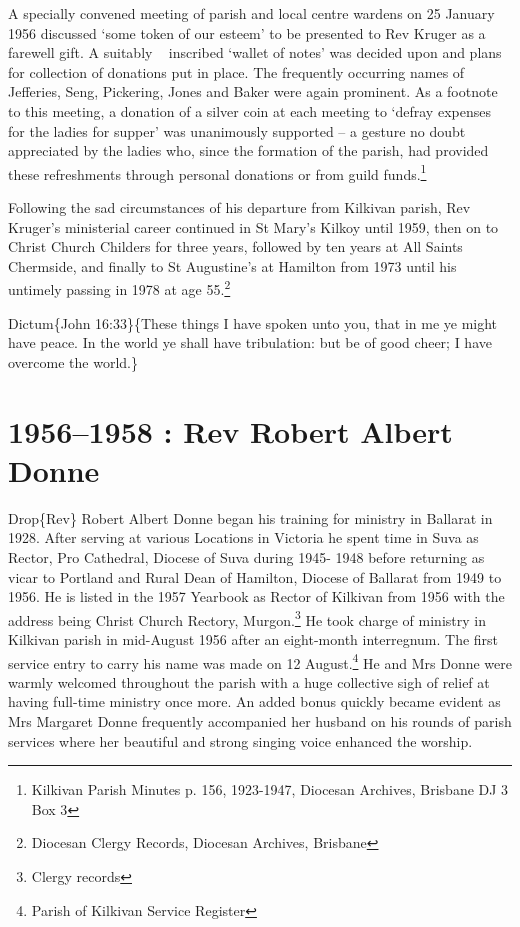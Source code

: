 A specially convened meeting of parish and local centre wardens on 25 January 1956 discussed `some token of our esteem' to be presented to Rev Kruger as a farewell gift. A suitably ~ inscribed `wallet of notes' was decided upon and plans for collection of donations put in place. The frequently occurring names of Jefferies, Seng, Pickering, Jones and Baker were again prominent. As a footnote to this meeting, a donation of a silver coin at each meeting to `defray expenses for the ladies for supper' was unanimously supported -- a gesture no doubt appreciated by the ladies who, since the formation of the parish, had provided these refreshments through personal donations or from guild funds.\footnote{Kilkivan Parish Minutes p. 156, 1923-1947, Diocesan Archives, Brisbane DJ 3 Box 3}

Following the sad circumstances of his departure from Kilkivan parish, Rev Kruger's ministerial career continued in St Mary's Kilkoy until 1959, then on to Christ Church Childers for three years, followed by ten years at All Saints Chermside, and finally to St Augustine's at Hamilton from 1973 until his untimely passing in 1978 at age 55.\footnote{Diocesan Clergy Records, Diocesan Archives, Brisbane}

Dictum\{John 16:33\}\{These things I have spoken unto you, that in me ye might have peace. In the world ye shall have tribulation: but be of good cheer; I have overcome the world.\}

\hypertarget{rev-robert-albert-donne}{%
\chapter{1956--1958 : Rev Robert Albert Donne}\label{rev-robert-albert-donne}}

Drop\{Rev\} Robert Albert Donne began his training for ministry in Ballarat in 1928. After serving at various Locations in Victoria he spent time in Suva as Rector, Pro Cathedral, Diocese of Suva during 1945- 1948 before returning as vicar to Portland and Rural Dean of Hamilton, Diocese of Ballarat from 1949 to 1956. He is listed in the 1957 Yearbook as Rector of Kilkivan from 1956 with the address being Christ Church Rectory, Murgon.\footnote{Clergy records} He took charge of ministry in Kilkivan parish in mid-August 1956 after an eight-month interregnum. The first service entry to carry his name was made on 12 August.\footnote{Parish of Kilkivan Service Register} He and Mrs Donne were warmly welcomed throughout the parish with a huge collective sigh of relief at having full-time ministry once more. An added bonus quickly became evident as Mrs Margaret Donne frequently accompanied her husband on his rounds of parish services where her beautiful and strong singing voice enhanced the worship.

